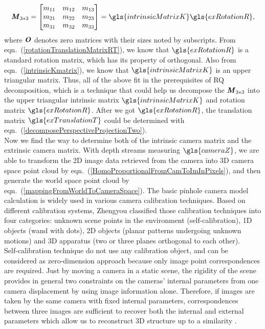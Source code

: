 \begin{equation}
\textbf{\textit{M}}_{3*3} =
\begin{bmatrix} 
m_{11} & m_{12} & m_{13} \\
m_{21} & m_{22} & m_{23} \\
m_{31} & m_{32} & m_{33}  
\end{bmatrix}%
=
\gls{intrinsicMatrixK} \gls{exRotationR}  ,
\label{QRdecompositionEquation}
\end{equation}%
\noindent
where \(\textbf{\textit{O}}\) denotes zero matrices with their sizes noted by subscripts. From eqn.~(\ref{rotationTranslationMatrixRT}), we know that \(\gls{exRotationR}\) is a standard rotation matrix, which has its property of orthogonal. Also from eqn.~(\ref{intrinsicKmatrix}), we know that \(\gls{intrinsicMatrixK}\) is an upper triangular matrix. Thus, all of the above fit in the prerequisites of RQ decomposition, which is a technique that could help us decompose the \(\textbf{\textit{M}}_{3*3}\) into the upper triangular intrinsic matrix \(\gls{intrinsicMatrixK}\) and rotation matrix \(\gls{exRotationR}\). After we got \(\gls{exRotationR}\), the translation matrix \(\gls{exTranslationT}\) could be determined with eqn.~(\ref{decomposePerspectiveProjectionTwo}).
\\\indent%
%
Now we find the way to determine both of the intrinsic camera matrix and the extrinsic camera matrix. With depth streams measuring \(\gls{cameraZ}\), we are able to transform the 2D image data retrieved from the camera into \gls{3D} camera space point cloud by eqn.~(\ref{HomoProportionalFromCamToImInPixels}), and then generate the world space point cloud by eqn.~(\ref{mappingFromWorldToCameraSpace}). The basic pinhole camera model calculation is widely used in various camera calibration techniques. Based on different calibration systems, Zhengyou \cite{Zhengyou04} classified those calibration techniques into four categories: unknown scene points in the environment (self-calibration), 1D objects (wand with dots), 2D objects (planar patterns undergoing unknown motions) and \gls{3D} apparatus (two or three planes orthogonal to each other). 
\\\indent
Self-calibration technique do not use any calibration object, and can be considered as zero-dimension approach because only image point correspondences are required. Just by moving a camera in a static scene, the rigidity of the scene provides in general two constraints \cite{selfCalibration3_1992} on the cameras' internal parameters from one camera displacement by using image information alone. Therefore, if images are taken by the same camera with fixed internal parameters, correspondences between three images are sufficient to recover both the internal and external parameters which allow us to reconstruct 3D structure up to a similarity \cite{selfCalibration2_1997, selfCalibration1_1994}. 
